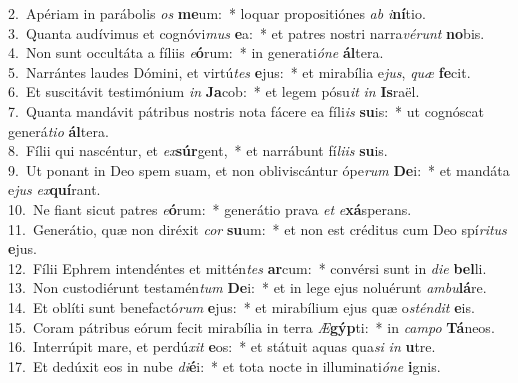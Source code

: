 {2.~}Apériam in parábolis \textit{os} \textbf{me}um:~* loquar propositiónes \textit{ab} \textit{i}\textbf{ní}tio.\\
{3.~}Quanta audívimus et cognóvi\textit{mus} \textbf{e}a:~* et patres nostri narra\textit{vé}\textit{runt} \textbf{no}bis.\\
{4.~}Non sunt occultáta a fíliis \textit{e}\textbf{ó}rum:~* in generati\textit{ó}\textit{ne} \textbf{ál}tera.\\
{5.~}Narrántes laudes Dómini, et virtú\textit{tes} \textbf{e}jus:~* et mirabília e\textit{jus}, \textit{quæ} \textbf{fe}cit.\\
{6.~}Et suscitávit testimónium \textit{in} \textbf{Ja}cob:~* et legem pósu\textit{it} \textit{in} \textbf{Is}raël.\\
{7.~}Quanta mandávit pátribus nostris nota fácere ea fíli\textit{is} \textbf{su}is:~* ut cognóscat generá\textit{ti}\textit{o} \textbf{ál}tera.\\
{8.~}Fílii qui nascéntur, et \textit{ex}\textbf{súr}gent,~* et narrábunt fí\textit{li}\textit{is} \textbf{su}is.\\
{9.~}Ut ponant in Deo spem suam, et non obliviscántur ópe\textit{rum} \textbf{De}i:~* et mandáta e\textit{jus} \textit{ex}\textbf{quí}rant.\\
{10.~}Ne fiant sicut patres \textit{e}\textbf{ó}rum:~* generátio prava \textit{et} \textit{e}\textbf{xá}sperans.\\
{11.~}Generátio, quæ non diréxit \textit{cor} \textbf{su}um:~* et non est créditus cum Deo spí\textit{ri}\textit{tus} \textbf{e}jus.\\
{12.~}Fílii Ephrem intendéntes et mittén\textit{tes} \textbf{ar}cum:~* convérsi sunt in \textit{di}\textit{e} \textbf{bel}li.\\
{13.~}Non custodiérunt testamén\textit{tum} \textbf{De}i:~* et in lege ejus noluérunt \textit{am}\textit{bu}\textbf{lá}re.\\
{14.~}Et oblíti sunt benefactó\textit{rum} \textbf{e}jus:~* et mirabílium ejus quæ o\textit{stén}\textit{dit} \textbf{e}is.\\
{15.~}Coram pátribus eórum fecit mirabília in terra \textit{Æ}\textbf{gýp}ti:~* in \textit{cam}\textit{po} \textbf{Tá}neos.\\
{16.~}Interrúpit mare, et perdú\textit{xit} \textbf{e}os:~* et státuit aquas qua\textit{si} \textit{in} \textbf{u}tre.\\
{17.~}Et dedúxit eos in nube \textit{di}\textbf{é}i:~* et tota nocte in illuminati\textit{ó}\textit{ne} \textbf{i}gnis.\\
